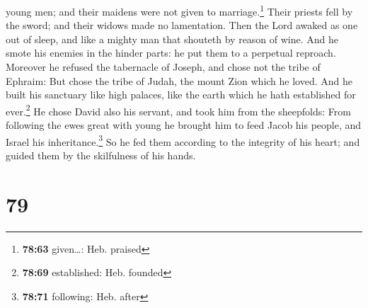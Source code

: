 young men; and their maidens were not given to marriage.\footnote{\textbf{78:63}
  given\ldots: Heb. praised}  Their priests fell by the
sword; and their widows made no lamentation.  Then the
Lord awaked as one out of sleep, and like a mighty man that shouteth by
reason of wine.  And he smote his enemies in the hinder
parts: he put them to a perpetual reproach.  Moreover he
refused the tabernacle of Joseph, and chose not the tribe of Ephraim:
 But chose the tribe of Judah, the mount Zion which he
loved.  And he built his sanctuary like high palaces,
like the earth which he hath established for ever.\footnote{\textbf{78:69}
  established: Heb. founded}  He chose David also his
servant, and took him from the sheepfolds:  From
following the ewes great with young he brought him to feed Jacob his
people, and Israel his inheritance.\footnote{\textbf{78:71} following:
  Heb. after}  So he fed them according to the integrity
of his heart; and guided them by the skilfulness of his hands.

\hypertarget{section-78}{%
\section{79}\label{section-78}}

